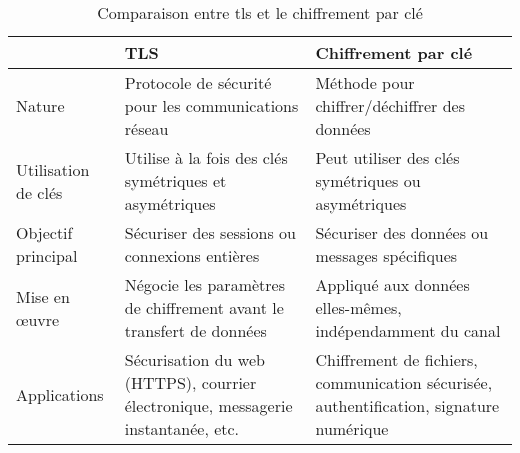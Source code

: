 \begin{table}[htbp]
    \centering
    \begin{tabularx}{\textwidth}{
        >{\raggedright\arraybackslash}p{2cm} 
        >{\raggedright\arraybackslash}X 
        >{\raggedright\arraybackslash}X}
        \toprule
        \rowcolor[HTML]{EFEFEF}
        \textbf{}           & \textbf{TLS}                                                                      & \textbf{Chiffrement par clé} \\
        \midrule
        Nature              & Protocole de sécurité pour les communications réseau                              & Méthode pour chiffrer/déchiffrer des données \\
        \midrule
        Utilisation de clés & Utilise à la fois des clés symétriques et asymétriques                            & Peut utiliser des clés symétriques ou asymétriques \\
        \midrule
        Objectif principal  & Sécuriser des sessions ou connexions entières                                     & Sécuriser des données ou messages spécifiques \\
        \midrule
        Mise en œuvre       & Négocie les paramètres de chiffrement avant le transfert de données               & Appliqué aux données elles-mêmes, indépendamment du canal \\
        \midrule
        Applications        & Sécurisation du web (HTTPS), courrier électronique, messagerie instantanée, etc.  & Chiffrement de fichiers, communication sécurisée, authentification, signature numérique \\
        \bottomrule
    \end{tabularx}
    \caption{Comparaison entre \acrshort{tls} et le chiffrement par clé}
    \label{tab:TLSvsKeyEncryption}
\end{table}